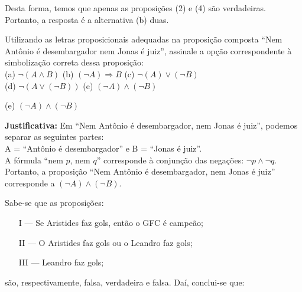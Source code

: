 \documentclass[12pt,letterpaper, onecolumn]{exam}
\begin{document}
\begin{questions}
\begin{solution}
        Desta forma, temos que apenas as proposições (2) e (4) são verdadeiras. Portanto, a resposta é a alternativa (b) duas.

        
    \end{solution}
    
    \question[q6] Utilizando as letras proposicionais adequadas na proposição composta “Nem Antônio é  desembargador nem Jonas é juiz”, assinale a opção correspondente à simbolização correta dessa proposição:\\[1em]
        (a) \( \neg ( A \wedge B ) \)           \hfill
        (b) \( ( \neg A ) \Rightarrow B \)      \hfill
        (c) \( \neg ( A ) \vee ( \neg B ) \)    \\[1em]
        (d) \( \neg ( A \vee ( \neg B ) ) \)    \hfill
        (e) \( ( \neg A ) \wedge ( \neg B ) \)
        
    \begin{solution}
        (e) \( ( \neg A ) \wedge ( \neg B ) \)
        
        \textbf{Justificativa:}
        Em  “Nem Antônio é desembargador, nem Jonas é juiz”, podemos separar as seguintes partes: \\[1em]
            A = “Antônio é desembargador” e 
            B = “Jonas é juiz”.\\[1em]
        A fórmula “nem \(p\), nem \(q\)” corresponde à conjunção das negações: \( \neg p \wedge \neg q \).   \\[1em]
        Portanto, a proposição “Nem Antônio é desembargador, nem Jonas é juiz” corresponde a \( ( \neg A ) \wedge ( \neg B ) \).
    \end{solution}
    
    \question[q7] Sabe-se que as proposições:
        \begin{enumerate}
            \item[I] — Se Aristides faz gols, então o GFC é campeão;
            \item[II] — O Aristides faz gols ou o Leandro faz gols;
            \item[III] — Leandro faz gols;
        \end{enumerate}
    são, respectivamente, falsa, verdadeira e falsa. Daí, conclui-se que:
    
\end{questions}
\end{document}
